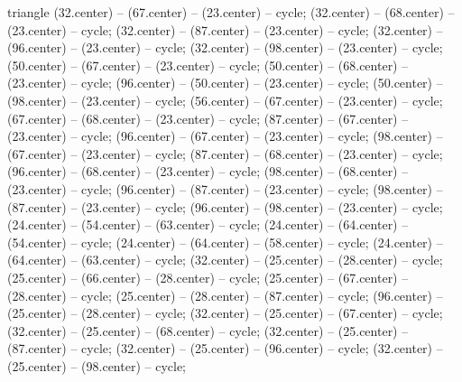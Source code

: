{\begin{pgfonlayer}{triangle}
 (32.center) -- (67.center) -- (23.center) -- cycle; 
 (32.center) -- (68.center) -- (23.center) -- cycle; 
 (32.center) -- (87.center) -- (23.center) -- cycle; 
 (32.center) -- (96.center) -- (23.center) -- cycle; 
 (32.center) -- (98.center) -- (23.center) -- cycle; 
 (50.center) -- (67.center) -- (23.center) -- cycle; 
 (50.center) -- (68.center) -- (23.center) -- cycle; 
 (96.center) -- (50.center) -- (23.center) -- cycle; 
 (50.center) -- (98.center) -- (23.center) -- cycle; 
 (56.center) -- (67.center) -- (23.center) -- cycle; 
 (67.center) -- (68.center) -- (23.center) -- cycle; 
 (87.center) -- (67.center) -- (23.center) -- cycle; 
 (96.center) -- (67.center) -- (23.center) -- cycle; 
 (98.center) -- (67.center) -- (23.center) -- cycle; 
 (87.center) -- (68.center) -- (23.center) -- cycle; 
 (96.center) -- (68.center) -- (23.center) -- cycle; 
 (98.center) -- (68.center) -- (23.center) -- cycle; 
 (96.center) -- (87.center) -- (23.center) -- cycle; 
 (98.center) -- (87.center) -- (23.center) -- cycle; 
 (96.center) -- (98.center) -- (23.center) -- cycle; 
 (24.center) -- (54.center) -- (63.center) -- cycle; 
 (24.center) -- (64.center) -- (54.center) -- cycle; 
 (24.center) -- (64.center) -- (58.center) -- cycle; 
 (24.center) -- (64.center) -- (63.center) -- cycle; 
 (32.center) -- (25.center) -- (28.center) -- cycle; 
 (25.center) -- (66.center) -- (28.center) -- cycle; 
 (25.center) -- (67.center) -- (28.center) -- cycle; 
 (25.center) -- (28.center) -- (87.center) -- cycle; 
 (96.center) -- (25.center) -- (28.center) -- cycle; 
 (32.center) -- (25.center) -- (67.center) -- cycle; 
 (32.center) -- (25.center) -- (68.center) -- cycle; 
 (32.center) -- (25.center) -- (87.center) -- cycle; 
 (32.center) -- (25.center) -- (96.center) -- cycle; 
 (32.center) -- (25.center) -- (98.center) -- cycle; 

\end{pgfonlayer}}
